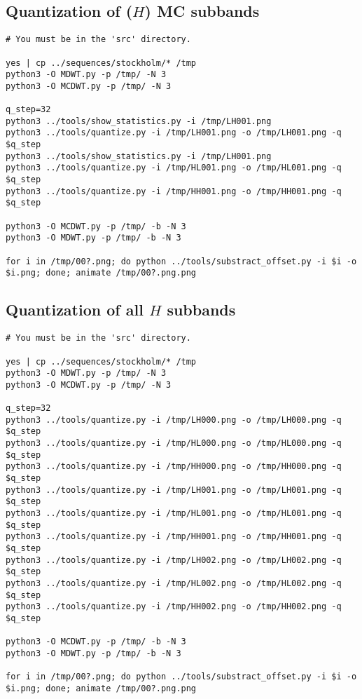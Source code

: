\subsection{Quantization of ($H$) MC subbands}
\begin{verbatim}
# You must be in the 'src' directory.

yes | cp ../sequences/stockholm/* /tmp
python3 -O MDWT.py -p /tmp/ -N 3
python3 -O MCDWT.py -p /tmp/ -N 3

q_step=32
python3 ../tools/show_statistics.py -i /tmp/LH001.png
python3 ../tools/quantize.py -i /tmp/LH001.png -o /tmp/LH001.png -q $q_step
python3 ../tools/show_statistics.py -i /tmp/LH001.png
python3 ../tools/quantize.py -i /tmp/HL001.png -o /tmp/HL001.png -q $q_step
python3 ../tools/quantize.py -i /tmp/HH001.png -o /tmp/HH001.png -q $q_step

python3 -O MCDWT.py -p /tmp/ -b -N 3
python3 -O MDWT.py -p /tmp/ -b -N 3

for i in /tmp/00?.png; do python ../tools/substract_offset.py -i $i -o $i.png; done; animate /tmp/00?.png.png
\end{verbatim}

\subsection{Quantization of all $H$ subbands}
\begin{verbatim}
# You must be in the 'src' directory.

yes | cp ../sequences/stockholm/* /tmp
python3 -O MDWT.py -p /tmp/ -N 3
python3 -O MCDWT.py -p /tmp/ -N 3

q_step=32
python3 ../tools/quantize.py -i /tmp/LH000.png -o /tmp/LH000.png -q $q_step
python3 ../tools/quantize.py -i /tmp/HL000.png -o /tmp/HL000.png -q $q_step
python3 ../tools/quantize.py -i /tmp/HH000.png -o /tmp/HH000.png -q $q_step
python3 ../tools/quantize.py -i /tmp/LH001.png -o /tmp/LH001.png -q $q_step
python3 ../tools/quantize.py -i /tmp/HL001.png -o /tmp/HL001.png -q $q_step
python3 ../tools/quantize.py -i /tmp/HH001.png -o /tmp/HH001.png -q $q_step
python3 ../tools/quantize.py -i /tmp/LH002.png -o /tmp/LH002.png -q $q_step
python3 ../tools/quantize.py -i /tmp/HL002.png -o /tmp/HL002.png -q $q_step
python3 ../tools/quantize.py -i /tmp/HH002.png -o /tmp/HH002.png -q $q_step

python3 -O MCDWT.py -p /tmp/ -b -N 3
python3 -O MDWT.py -p /tmp/ -b -N 3

for i in /tmp/00?.png; do python ../tools/substract_offset.py -i $i -o $i.png; done; animate /tmp/00?.png.png
\end{verbatim}

